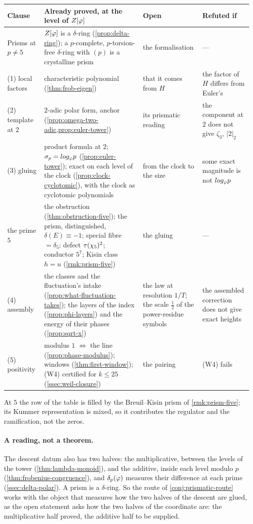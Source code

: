 \begin{center}\small
\begin{tabular}{p{2.6cm}p{4.1cm}p{3.1cm}p{3.2cm}}
\toprule
Clause & Already proved, at the level of $Z[\varphi]$ & Open & Refuted if \\
\midrule
Prisms at $p\ne5$ & $Z[\varphi]$ is a $\delta$-ring (\cref{prop:delta-ring}); a $p$-complete, $p$-torsion-free $\delta$-ring with $(p)$ is a crystalline prism \cite{bhattscholze22} & the formalisation & --- \\
(1) local factors & characteristic polynomial (\cref{thm:frob-eigen}) & that it comes from $H$ & the factor of $H$ differs from Euler's \\
(2) template at $2$ & $2$-adic polar form, anchor (\cref{prop:omega-two-adic,prop:euler-tower}) & its prismatic reading & the component at $2$ does not give $\zeta_3$, $|2|_2$ \\
(3) gluing & product formula at $2$; $\sigma_p=log_\varphi p$ (\cref{prop:euler-tower}); exact on each level of the clock (\cref{prop:clock-cyclotomic}), with the clock as cyclotomic polynomials & from the clock to the size & some exact magnitude is not $log_\varphi p$ \\
the prime $5$ & the obstruction (\cref{thm:obstruction-five}); the prism, distinguished, $\delta(E)\equiv-1$; special fibre $=\delta_5$; defect $\tau(\chi_5)^2$; conductor $5^7$; Kisin class $h=u$ (\cref{rmk:prism-five}) & the gluing & --- \\
(4) assembly & the classes and the fluctuation's intake (\cref{prop:what-fluctuation-takes}); the layers of the index (\cref{prop:phi-layers}) and the energy of their phases (\cref{prop:sqrt-x}) & the law at resolution $1/T$; the scale $\tfrac12$ of the power-residue symbols & the assembled correction does not give exact heights \\
(5) positivity & modulus $1$ $\Leftrightarrow$ the line (\cref{prop:phase-modulus}); windows (\cref{thm:first-window}); (W4) certified for $k\le25$ (\cref{ssec:weil-closure}) & the pairing & (W4) fails \\
\bottomrule
\end{tabular}
\end{center}

At $5$ the row of the table is filled by the Breuil--Kisin prism of \cref{rmk:prism-five}; its
Kummer representation is mixed, so it contributes the regulator and the ramification, not the
zeros.

\paragraph{A reading, not a theorem.}  The descent datum also has two halves: the multiplicative,
between the levels of the tower (\cref{thm:lambda-monoid}), and the additive, inside each level modulo
$p$ (\cref{thm:frobenius-congruence}), and $\delta_p(\varphi)$ measures their difference at each prime
(\cref{ssec:delta-polar}).  A prism is a $\delta$-ring.  So the route of \cref{conj:prismatic-route}
works with the object that measures how the two halves of the descent are glued, as the open
statement asks how the two halves of the coordinate are: the multiplicative half proved, the
additive half to be supplied.

